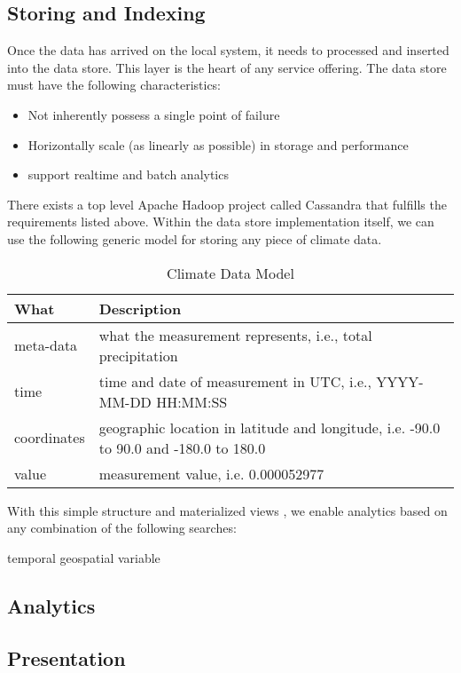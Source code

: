 \subsection*{Storing and Indexing}
Once the data has arrived on the local system, it needs to processed and inserted into the data store. This layer is the heart of any service offering. The data store must have the following characteristics:
\begin{itemize}
	\item Not inherently possess a single point of failure
	\item Horizontally scale (as linearly as possible) in storage and performance
	\item support realtime and batch analytics
\end{itemize}
There exists a top level Apache Hadoop project called Cassandra\cite{cassandra} that fulfills the requirements listed above. Within the data store implementation itself, we can use the following generic model for storing any piece of climate data.
\begin{table}[htbp]
	\caption*{Climate Data Model}
	\centering
	\begin{tabular}{l l}
		\hline
		What & Description \\ [0.5ex]
		\hline
		meta-data & what the measurement represents, i.e., total precipitation\\
		time & time and date of measurement in UTC, i.e., YYYY-MM-DD HH:MM:SS\\
		coordinates & geographic location in latitude and longitude, i.e. -90.0 to 90.0 and -180.0 to 180.0\\
		value & measurement value, i.e. 0.000052977\\
		\hline
	\end{tabular}
\end{table}

With this simple structure and materialized views \cite{materialized_views}, we enable analytics based on any combination of the following searches:

temporal 
geospatial
variable

\subsection*{Analytics}

\subsection*{Presentation}


\renewcommand\bibname{{References}}



